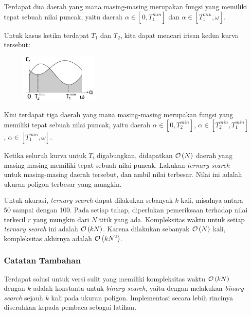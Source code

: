 \documentclass[../main_editorial.tex]{subfiles} %
\begin{document}
Terdapat dua daerah yang mana masing-masing merupakan fungsi yang memiliki tepat sebuah nilai puncak, yaitu daerah $\alpha \in [0, T_1^{min}]$ dan $\alpha \in [T_1^{min}, \omega]$.

Untuk kasus ketika terdapat $T_1$ dan $T_2$, kita dapat mencari irisan kedua kurva tersebut:

\begin{figure}[H]\centering
	\centering
	\includegraphics[width=0.35\textwidth]{balon/asset/hard-chart2.pdf}
\end{figure}

Kini terdapat tiga daerah yang mana masing-masing merupakan fungsi yang memiliki tepat sebuah nilai puncak, yaitu daerah $\alpha \in [0, T_2^{min}]$, $\alpha \in [T_2^{min}, T_1^{min}]$, $\alpha \in [T_1^{min}, \omega]$.

Ketika seluruh kurva untuk $T_i$ digabungkan, didapatkan $\mathcal{O}\left( N \right)$ daerah yang masing-masing memiliki tepat sebuah nilai puncak. Lakukan \textit{ternary search} untuk masing-masing daerah tersebut, dan ambil nilai terbesar. Nilai ini adalah ukuran poligon terbesar yang mungkin.

Untuk akurasi, \textit{ternary search} dapat dilakukan sebanyak $k$ kali, misalnya antara 50 sampai dengan 100. Pada setiap tahap, diperlukan pemeriksaan terhadap nilai terkecil $r$ yang mungkin dari $N$ titik yang ada. Kompleksitas waktu untuk setiap \textit{ternary search} ini adalah $\mathcal{O}\left( kN \right)$. Karena dilakukan sebanyak $\mathcal{O}\left( N \right)$ kali, kompleksitas akhirnya adalah  $\mathcal{O}\left( kN^2 \right)$.


\subsubsection*{Catatan Tambahan}

Terdapat solusi untuk versi sulit yang memiliki kompleksitas waktu $\mathcal{O}\left( kN \right)$ dengan $ k $ adalah konstanta untuk \textit{binary search}, yaitu dengan melakukan \textit{binary search} sejauh $ k $ kali pada ukuran poligon. Implementasi secara lebih rincinya diserahkan kepada pembaca sebagai latihan. 
\end{document}

